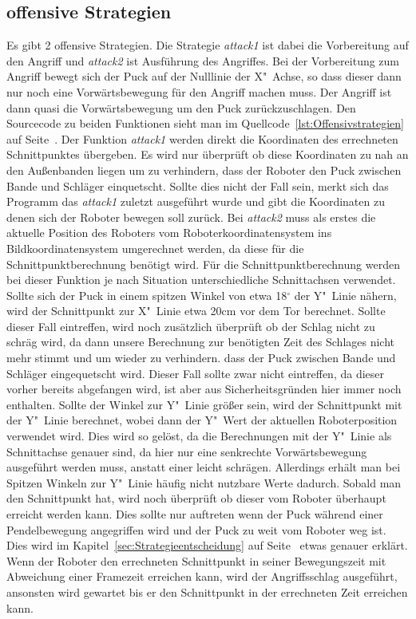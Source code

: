 \subsection{offensive Strategien}
Es gibt 2 offensive Strategien. Die Strategie \textit{attack1} ist dabei die Vorbereitung auf den Angriff und \textit{attack2} ist Ausführung des Angriffes. Bei der Vorbereitung zum Angriff bewegt sich der Puck auf der Nulllinie der X"~Achse, so dass dieser dann nur noch eine Vorwärtsbewegung für den Angriff machen muss. Der Angriff ist dann quasi die Vorwärtsbewegung um den Puck zurückzuschlagen.
Den Sourcecode zu beiden Funktionen sieht man im Quellcode~\ref{lst:Offensivstrategien} auf Seite~\pageref{lst:Offensivstrategien}.
Der Funktion \textit{attack1} werden direkt die Koordinaten des errechneten Schnittpunktes übergeben. Es wird nur überprüft ob diese Koordinaten zu nah an den Außenbanden liegen um zu verhindern, dass der Roboter den Puck zwischen Bande und Schläger einquetscht. Sollte dies nicht der Fall sein, merkt sich das Programm das \textit{attack1} zuletzt ausgeführt wurde und gibt die Koordinaten zu denen sich der Roboter bewegen soll zurück.
Bei \textit{attack2} muss als erstes die aktuelle Position des Roboters vom Roboterkoordinatensystem ins Bildkoordinatensystem umgerechnet werden, da diese für die Schnittpunktberechnung benötigt wird. Für die Schnittpunktberechnung werden bei dieser Funktion je nach Situation unterschiedliche Schnittachsen verwendet. Sollte sich der Puck in einem spitzen Winkel von etwa 18$^\circ$ der Y"~Linie nähern, wird der Schnittpunkt zur X"~Linie etwa 20cm vor dem Tor berechnet. Sollte dieser Fall eintreffen, wird noch zusätzlich überprüft ob der Schlag nicht zu schräg wird, da dann unsere Berechnung zur benötigten Zeit des Schlages nicht mehr stimmt und um wieder zu verhindern. dass der Puck zwischen Bande und Schläger eingequetscht wird. Dieser Fall sollte zwar nicht eintreffen, da dieser vorher bereits abgefangen wird, ist aber aus Sicherheitsgründen hier immer noch enthalten. Sollte der Winkel zur Y"~Linie größer sein, wird der Schnittpunkt mit der Y"~Linie berechnet, wobei dann der Y"~Wert der aktuellen Roboterposition verwendet wird. Dies wird so gelöst, da die Berechnungen mit der Y"~Linie als Schnittachse genauer sind, da hier nur eine senkrechte Vorwärtsbewegung ausgeführt werden muss, anstatt einer leicht schrägen. Allerdings erhält man bei Spitzen Winkeln zur Y"~Linie häufig nicht nutzbare Werte dadurch. Sobald man den Schnittpunkt hat, wird noch überprüft ob dieser vom Roboter überhaupt erreicht werden kann. Dies sollte nur auftreten wenn der Puck während einer Pendelbewegung angegriffen wird und der Puck zu weit vom Roboter weg ist. Dies wird im Kapitel~\ref{sec:Strategieentscheidung} auf Seite~\pageref{sec:Strategieentscheidung} etwas genauer erklärt. Wenn der Roboter den errechneten Schnittpunkt in seiner Bewegungszeit mit Abweichung einer Framezeit erreichen kann, wird der Angriffsschlag ausgeführt, ansonsten wird gewartet bis er den Schnittpunkt in der errechneten Zeit erreichen kann.
